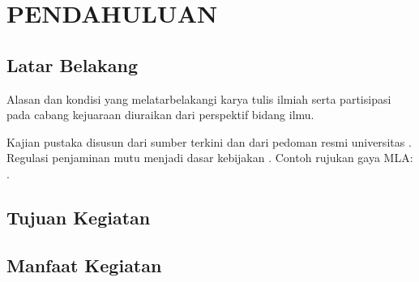 \chapter{PENDAHULUAN}
\section{Latar Belakang}
Alasan dan kondisi yang melatarbelakangi karya tulis ilmiah serta partisipasi pada cabang
kejuaraan diuraikan dari perspektif bidang ilmu.

Kajian pustaka disusun dari sumber terkini \citep{creswell2018research, patten2017understanding}
dan dari pedoman resmi universitas \citep{unnes2024panduanakademik}. Regulasi penjaminan mutu
menjadi dasar kebijakan \citep{permendikbudristek2023}.
 Contoh rujukan gaya MLA: .

\section{Tujuan Kegiatan}
\section{Manfaat Kegiatan}
